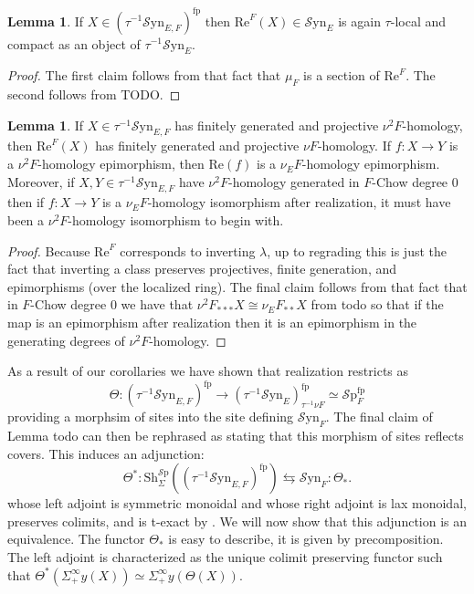\documentclass[10pt]{amsart}
\theoremstyle{definition}
\numberwithin{figure}{section}
\numberwithin{equation}{section}
\newtheorem{lemma}[figure]{Lemma}
\theoremstyle{cited}
\newcommand{\Sp}{{\mathcal{S}\mathrm{p}}}
\newcommand{\Sh}{\mathrm{Sh}}
\newcommand{\fp}{\mathrm{fp}}
\newcommand{\Syn}{\mathcal{S}\mathrm{yn}}
\renewcommand{\Re}{\mathrm{Re}}
\begin{document}
\begin{lemma}
  If $X\in (\tau^{-1}\Syn_{E,F})^\fp$ then $\Re^F(X)\in \Syn_E$ is again $\tau$-local and compact as an object of $\tau^{-1}\Syn_E$.
\end{lemma}

\begin{proof}
  The first claim follows from that fact that $\mu_F$ is a section of $\Re^{F}$. The second follows from TODO.
\end{proof}

\begin{lemma}
  If $X\in \tau^{-1}\Syn_{E,F}$ has finitely generated and projective $\nu^2F$-homology, then $\Re^F(X)$ has finitely generated and projective $\nu F$-homology. If $f:X\to Y$ is a $\nu^2F$-homology epimorphism, then $\Re(f)$ is a $\nu_E F$-homology epimorphism. Moreover, if $X,Y\in \tau^{-1}\Syn_{E,F}$ have $\nu^2F$-homology generated in $F$-Chow degree $0$ then if $f:X\to Y$ is a $\nu_EF$-homology isomorphism after realization, it must have been a $\nu^2F$-homology isomorphism to begin with.
\end{lemma}

\begin{proof}
  Because $\Re^F$ corresponds to inverting $\lambda$, up to regrading this is just the fact that inverting a class preserves projectives, finite generation, and epimorphisms (over the localized ring). The final claim follows from that fact that in $F$-Chow degree $0$ we have that $\nu^2F_{***}X\cong \nu_E F_{**}X$ from todo so that if the map is an epimorphism after realization then it is an epimorphism in the generating degrees of $\nu^2F$-homology.
\end{proof}

As a result of our corollaries we have shown that realization restricts as
\[
\Theta:(\tau^{-1}\Syn_{E,F})^\fp \to (\tau^{-1}\Syn_E)^\fp_{\tau^{-1}\nu F}\simeq \Sp^\fp_F
\]
providing a morphsim of sites into the site defining $\Syn_F$. The final claim of Lemma todo can then be rephrased as stating that this morphism of sites reflects covers. This induces an adjunction:
\[
\Theta^*: \Sh^\Sp_\Sigma((\tau^{-1}\Syn_{E,F})^\fp) \leftrightarrows \Syn_F:\Theta_*.
\]
whose left adjoint is symmetric monoidal and whose right adjoint is lax monoidal, preserves colimits, and is t-exact by \cite[Prop. 2.22, Rem. 2.23]{Pst22}. We will now show that this adjunction is an equivalence. The functor $\Theta_*$ is easy to describe, it is given by precomposition. The left adjoint is characterized as the unique colimit preserving functor such that $\Theta^*(\Sigma^\infty_+y(X))\simeq \Sigma_+^\infty y(\Theta(X))$.
\end{document}

